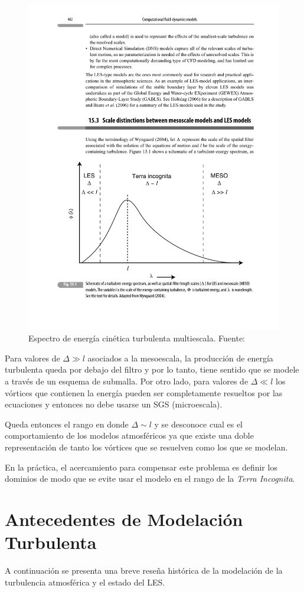\begin{figure}[H]
	\centering
	\includegraphics[width=0.69\linewidth,trim={2cm 3.0cm 1.5cm 11.5cm},clip]{Imagenes/02/terra_inc}
	\caption{Espectro de energía cinética turbulenta multiescala. Fuente: \cite{warner2010numerical}}
	\label{fig:02_terra_inc}
\end{figure}

Para valores de $\Delta\gg l$ asociados a la mesoescala, la producción de energía turbulenta queda por debajo del filtro y por lo tanto, tiene sentido que se modele a través de un esquema de submalla. Por otro lado, para valores de $\Delta\ll l$ los vórtices que contienen la energía pueden ser completamente resueltos por las ecuaciones y entonces no debe usarse un SGS (microescala).

Queda entonces el rango en donde $\Delta\sim l$ y se desconoce cual es el comportamiento de los modelos atmosféricos ya que existe una doble representación de tanto los vórtices que se resuelven como los que se modelan.

En la práctica, el acercamiento para compensar este problema es definir los dominios de modo que se evite usar el modelo en el rango de la \emph{Terra Incognita}.

\newpage
\section{Antecedentes de Modelación Turbulenta}
A continuación se presenta una breve reseña histórica de la modelación de la turbulencia atmosférica y el estado del LES.

